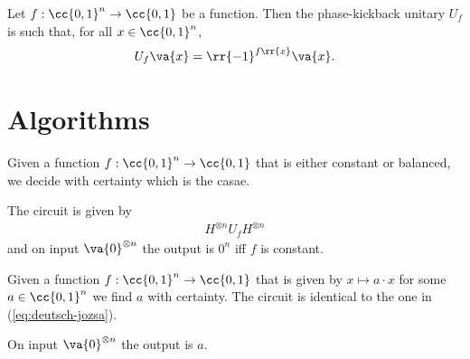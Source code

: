 \documentclass{article}
\begin{document}
\begin{definition}
  Let $f:\cc{0,1}^n\to \cc{0,1}$ be a function. Then the phase-kickback unitary
  $U_f$ is such that, for all $x\in\cc{0,1}^n$,
  \begin{align*}
    U_f \va{x}= \rr{-1}^{f\rr{x}}\va{x}.
  \end{align*}
\end{definition}

\section{Algorithms}

\begin{algorithm}\label{alg:deutsch-jozsa}
  Given a function $f:\cc{0,1}^n\to\cc{0,1}$ that is either constant or balanced,
  we decide with certainty which is the casae.

  The circuit is given by
  \begin{align}
    \label{eq:deutsch-jozsa}
    H^{\otimes n} U_f H^{\otimes n}
  \end{align}
  and on input $\va{0}^{\otimes n}$ the output is $0^n$ iff $f$ is constant.
\end{algorithm}

\begin{algorithm}\label{alg:bernstein-vazirani}
  Given a function $f:\cc{0,1}^n\to\cc{0,1}$ that is given by $x\mapsto a\cdot x$ for some
  $a\in\cc{0,1}^n$ we find $a$ with certainty. The circuit is identical to the one in
  (\ref{eq:deutsch-jozsa}).

  On input $\va{0}^{\otimes n}$ the output is $a$.
\end{algorithm}
\end{document}
